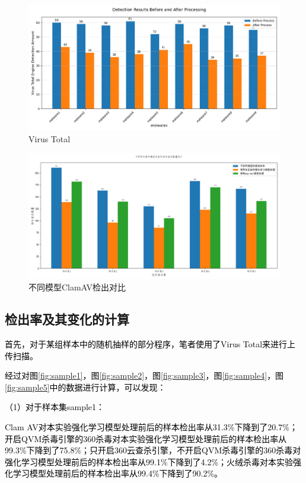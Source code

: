 \begin{figure}
  \centering
  \includegraphics[]{images/Virus_Total.png}
  \caption{Virus Total}\label{fig:Virus_Total}
\end{figure}

\begin{figure}
  \centering
  \includegraphics[]{images/compare_with_different_model.png}
  \caption{不同模型ClamAV检出对比}\label{fig:compare_with_different_model}
\end{figure}

\subsection{检出率及其变化的计算}

\textcolor{black}{首先，对于某组样本中的随机抽样的部分程序，笔者使用了Virus Total来进行上传扫描。}

\textcolor{black}{经过对图\ref{fig:sample1}，图\ref{fig:sample2}，图\ref{fig:sample3}，图\ref{fig:sample4}，图\ref{fig:sample5}中的数据进行计算，可以发现：}

\textcolor{black}{（1）对于样本集sample1：}

\textcolor{black}{Clam AV对本实验强化学习模型处理前后的样本检出率从31.3\%下降到了20.7\%；开启QVM杀毒引擎的360杀毒对本实验强化学习模型处理前后的样本检出率从99.3\%下降到了75.8\%；只开启360云查杀引擎，不开启QVM杀毒引擎的360杀毒对强化学习模型处理前后的样本检出率从99.1\%下降到了4.2\%；火绒杀毒对本实验强化学习模型处理前后的样本检出率从99.4\%下降到了90.2\%。}

